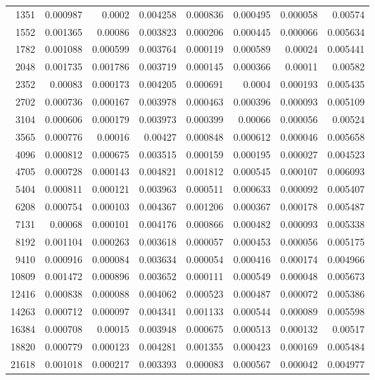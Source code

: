 \begin{longtable}{r r r r r r r r}
1351 & 0.000987 & 0.0002 & 0.004258 & 0.000836 & 0.000495 & 0.000058 & 0.00574 \\
1552 & 0.001365 & 0.00086 & 0.003823 & 0.000206 & 0.000445 & 0.000066 & 0.005634 \\
1782 & 0.001088 & 0.000599 & 0.003764 & 0.000119 & 0.000589 & 0.00024 & 0.005441 \\
2048 & 0.001735 & 0.001786 & 0.003719 & 0.000145 & 0.000366 & 0.00011 & 0.00582 \\
2352 & 0.00083 & 0.000173 & 0.004205 & 0.000691 & 0.0004 & 0.000193 & 0.005435 \\
2702 & 0.000736 & 0.000167 & 0.003978 & 0.000463 & 0.000396 & 0.000093 & 0.005109 \\
3104 & 0.000606 & 0.000179 & 0.003973 & 0.000399 & 0.00066 & 0.000056 & 0.00524 \\
3565 & 0.000776 & 0.00016 & 0.00427 & 0.000848 & 0.000612 & 0.000046 & 0.005658 \\
4096 & 0.000812 & 0.000675 & 0.003515 & 0.000159 & 0.000195 & 0.000027 & 0.004523 \\
4705 & 0.000728 & 0.000143 & 0.004821 & 0.001812 & 0.000545 & 0.000107 & 0.006093 \\
5404 & 0.000811 & 0.000121 & 0.003963 & 0.000511 & 0.000633 & 0.000092 & 0.005407 \\
6208 & 0.000754 & 0.000103 & 0.004367 & 0.001206 & 0.000367 & 0.000178 & 0.005487 \\
7131 & 0.00068 & 0.000101 & 0.004176 & 0.000866 & 0.000482 & 0.000093 & 0.005338 \\
8192 & 0.001104 & 0.000263 & 0.003618 & 0.000057 & 0.000453 & 0.000056 & 0.005175 \\
9410 & 0.000916 & 0.000084 & 0.003634 & 0.000054 & 0.000416 & 0.000174 & 0.004966 \\
10809 & 0.001472 & 0.000896 & 0.003652 & 0.000111 & 0.000549 & 0.000048 & 0.005673 \\
12416 & 0.000838 & 0.000088 & 0.004062 & 0.000523 & 0.000487 & 0.000072 & 0.005386 \\
14263 & 0.000712 & 0.000097 & 0.004341 & 0.001133 & 0.000544 & 0.000089 & 0.005598 \\
16384 & 0.000708 & 0.00015 & 0.003948 & 0.000675 & 0.000513 & 0.000132 & 0.00517 \\
18820 & 0.000779 & 0.000123 & 0.004281 & 0.001355 & 0.000423 & 0.000169 & 0.005484 \\
21618 & 0.001018 & 0.000217 & 0.003393 & 0.000083 & 0.000567 & 0.000042 & 0.004977 \\

\end{longtable}
